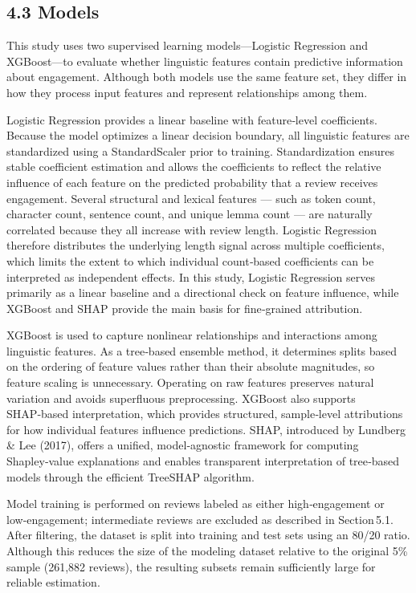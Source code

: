 \documentclass[
]{article}
\begin{document}
\hypertarget{models}{%
\subsection{4.3 Models}\label{models}}

This study uses two supervised learning models---Logistic Regression and
XGBoost---to evaluate whether linguistic features contain predictive
information about engagement. Although both models use the same feature
set, they differ in how they process input features and represent
relationships among them.

Logistic Regression provides a linear baseline with feature‑level
coefficients. Because the model optimizes a linear decision boundary,
all linguistic features are standardized using a StandardScaler prior to
training. Standardization ensures stable coefficient estimation and
allows the coefficients to reflect the relative influence of each
feature on the predicted probability that a review receives engagement.
Several structural and lexical features --- such as token count,
character count, sentence count, and unique lemma count --- are
naturally correlated because they all increase with review length.
Logistic Regression therefore distributes the underlying length signal
across multiple coefficients, which limits the extent to which
individual count‑based coefficients can be interpreted as independent
effects. In this study, Logistic Regression serves primarily as a linear
baseline and a directional check on feature influence, while XGBoost and
SHAP provide the main basis for fine‑grained attribution.

XGBoost is used to capture nonlinear relationships and interactions
among linguistic features. As a tree‑based ensemble method, it
determines splits based on the ordering of feature values rather than
their absolute magnitudes, so feature scaling is unnecessary. Operating
on raw features preserves natural variation and avoids superfluous
preprocessing. XGBoost also supports SHAP‑based interpretation, which
provides structured, sample‑level attributions for how individual
features influence predictions. SHAP, introduced by Lundberg \& Lee
(2017), offers a unified, model‑agnostic framework for computing
Shapley‑value explanations and enables transparent interpretation of
tree‑based models through the efficient TreeSHAP algorithm.

Model training is performed on reviews labeled as either high‑engagement
or low‑engagement; intermediate reviews are excluded as described in
Section\,5.1. After filtering, the dataset is split into training and
test sets using an 80/20 ratio. Although this reduces the size of the
modeling dataset relative to the original 5\% sample (261,882 reviews),
the resulting subsets remain sufficiently large for reliable estimation.
\end{document}
